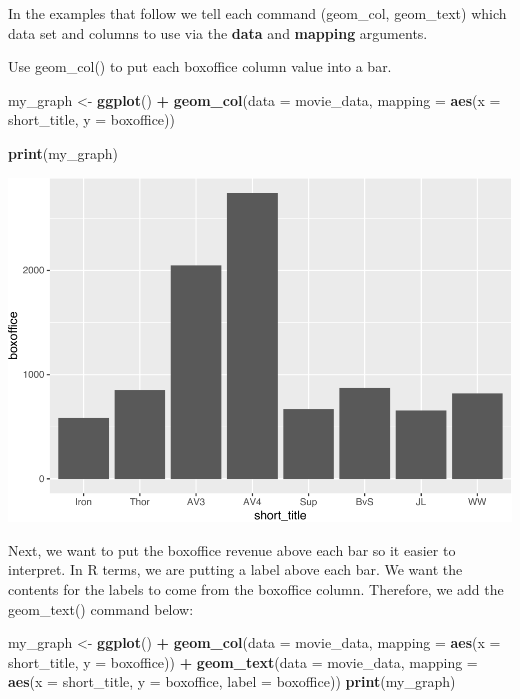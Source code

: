 \documentclass[
]{krantz}
\makeatletter
\newenvironment{Shaded}{\begin{snugshade}}{\end{snugshade}}
\newcommand{\DataTypeTok}[1]{\textcolor[rgb]{0.27,0.27,0.27}{#1}}
\newcommand{\KeywordTok}[1]{\textcolor[rgb]{0.27,0.27,0.27}{\textbf{#1}}}
\newcommand{\NormalTok}[1]{#1}
\newcommand{\OperatorTok}[1]{\textcolor[rgb]{0.43,0.43,0.43}{\textbf{#1}}}
\newcommand{\StringTok}[1]{\textcolor[rgb]{0.5,0.5,0.5}{#1}}
\newenvironment{kframe}{%
\medskip{}
\setlength{\fboxsep}{.8em}
 \def\at@end@of@kframe{}%
 \ifinner\ifhmode%
  \def\at@end@of@kframe{\end{minipage}}%
  \begin{minipage}{\columnwidth}%
 \fi\fi%
 \def\FrameCommand##1{\hskip\@totalleftmargin \hskip-\fboxsep
 \colorbox{shadecolor}{##1}\hskip-\fboxsep
     \hskip-\linewidth \hskip-\@totalleftmargin \hskip\columnwidth}%
 \MakeFramed {\advance\hsize-\width
   \@totalleftmargin\z@ \linewidth\hsize
   \@setminipage}}%
 {\par\unskip\endMakeFramed%
 \at@end@of@kframe}
\renewenvironment{Shaded}{\begin{kframe}}{\end{kframe}}
\makeatother
\begin{document}
In the examples that follow we tell each command (geom\_col, geom\_text) which data set and columns to use via the \textbf{data} and \textbf{mapping} arguments.

Use geom\_col() to put each boxoffice column value into a bar.

\begin{Shaded}
\begin{Highlighting}[]
\NormalTok{my_graph <-}\StringTok{ }\KeywordTok{ggplot}\NormalTok{() }\OperatorTok{+}
\StringTok{  }\KeywordTok{geom_col}\NormalTok{(}\DataTypeTok{data =}\NormalTok{ movie_data,}
           \DataTypeTok{mapping =} \KeywordTok{aes}\NormalTok{(}\DataTypeTok{x =}\NormalTok{ short_title, }
                         \DataTypeTok{y =}\NormalTok{ boxoffice))}

\KeywordTok{print}\NormalTok{(my_graph)}
\end{Highlighting}
\end{Shaded}

\includegraphics{bookdown_files/figure-latex/unnamed-chunk-239-1.pdf}

Next, we want to put the boxoffice revenue above each bar so it easier to interpret. In R terms, we are putting a label above each bar. We want the contents for the labels to come from the boxoffice column. Therefore, we add the geom\_text() command below:

\begin{Shaded}
\begin{Highlighting}[]
\NormalTok{my_graph <-}\StringTok{ }\KeywordTok{ggplot}\NormalTok{() }\OperatorTok{+}
\StringTok{  }\KeywordTok{geom_col}\NormalTok{(}\DataTypeTok{data =}\NormalTok{ movie_data,}
           \DataTypeTok{mapping =} \KeywordTok{aes}\NormalTok{(}\DataTypeTok{x =}\NormalTok{ short_title, }
                         \DataTypeTok{y =}\NormalTok{ boxoffice)) }\OperatorTok{+}
\StringTok{  }\KeywordTok{geom_text}\NormalTok{(}\DataTypeTok{data =}\NormalTok{ movie_data, }
           \DataTypeTok{mapping =} \KeywordTok{aes}\NormalTok{(}\DataTypeTok{x =}\NormalTok{ short_title, }
                         \DataTypeTok{y =}\NormalTok{ boxoffice, }
                         \DataTypeTok{label =}\NormalTok{ boxoffice))}
\KeywordTok{print}\NormalTok{(my_graph)}
\end{Highlighting}
\end{Shaded}
\end{document}
